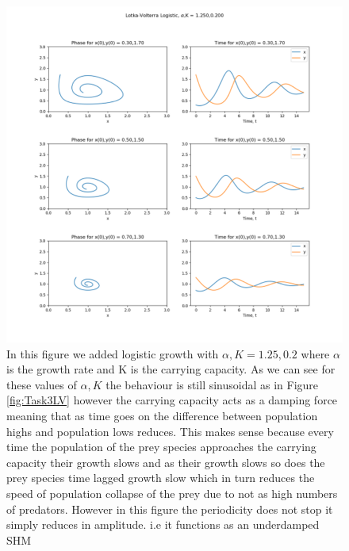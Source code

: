 \documentclass[11pt,a4paper]{CLabBookTemplate} %
\begin{document}
\begin{figure}[h!]
	\centering
	\includegraphics[width = 160mm]{Figures/Task3LLV0.png}
	\caption{In this figure we added logistic growth with $\alpha,K = 1.25,0.2$ where $\alpha$ is the growth rate and K is the carrying capacity. As we can see for these values of $\alpha,K$ the behaviour is still sinusoidal as in Figure \ref{fig:Task3LV} however the carrying capacity acts as a damping force meaning that as time goes on the difference between population highs and population lows reduces. This makes sense because every time the population of the prey species approaches the carrying capacity their growth slows and as their growth slows so does the prey species time lagged growth slow which in turn reduces the speed of population collapse of the prey due to not as high numbers of predators. However in this figure the periodicity does not stop it simply reduces in amplitude. i.e it functions as an underdamped SHM}
	\label{fig:Task3LLV0}
\end{figure}
\end{document}
